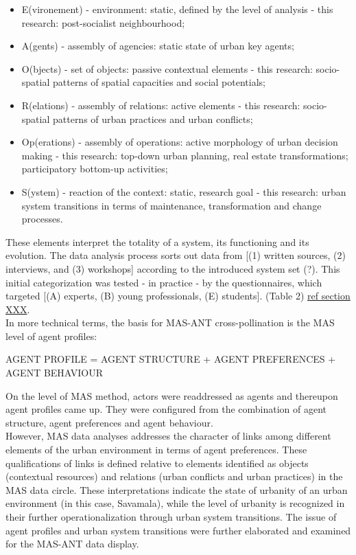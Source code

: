 \documentclass[11pt]{report}
\begin{document}
\begin{itemize}
\item E(vironement) - environment: static, defined by the level of analysis - this research: post-socialist neighbourhood;
\item A(gents) - assembly of agencies: static state of urban key agents;
\item O(bjects) - set of objects: passive contextual elements - this research: socio-spatial patterns of spatial capacities and social potentials;
\item R(elations) - assembly of relations: active elements - this research: socio-spatial patterns of urban practices and urban conflicts;
\item Op(erations) - assembly of operations: active morphology of urban decision making - this research: top-down urban planning, real estate transformations; participatory bottom-up activities;
\item S(ystem) - reaction of the context: static, research goal - this research:  urban system transitions in terms of maintenance, transformation and change processes.
\end{itemize}

These elements interpret the totality of a system, its functioning and its evolution.
The data analysis process sorts out data from [(1) written sources, (2) interviews, and (3) workshops] according to the introduced system set (?).
This initial categorization was tested - in practice - by the questionnaires, which targeted [(A) experts, (B) young professionals, (E) students].
 (Table 2) \href{}{ref section XXX}.
\\
In more technical terms, the basis for MAS-ANT cross-pollination is the MAS level of agent profiles:

AGENT PROFILE = AGENT STRUCTURE + AGENT PREFERENCES + AGENT BEHAVIOUR

On the level of MAS method, actors were readdressed as agents and thereupon agent profiles came up. They were configured from the combination of agent structure, agent preferences and agent behaviour.
\\
However, MAS data analyses addresses the character of links among different elements of the urban environment in terms of agent preferences. These qualifications of links is defined relative to elements identified as objects (contextual resources) and relations (urban conflicts and urban practices) in the MAS data circle. These interpretations indicate the state of urbanity of an urban environment (in this case, Savamala), while the level of urbanity is recognized in their further operationalization through urban system transitions.
The issue of agent profiles and urban system transitions were further elaborated and examined for the MAS-ANT data display.
\end{document}

